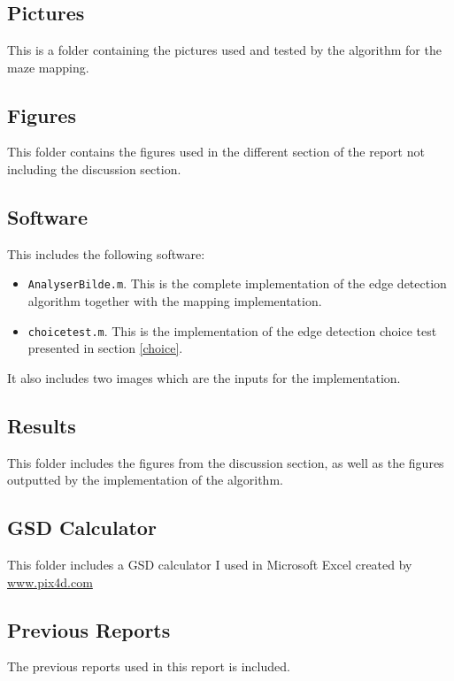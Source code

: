 \section{}
\subsection{Pictures}
This is a folder containing the pictures used and tested by the algorithm for the maze mapping. 
\subsection{Figures}
This folder contains the figures used in the different section of the report not including the discussion section.
\subsection{Software}
This includes the following software:
\begin{itemize}
\item \texttt{AnalyserBilde.m}. This is the complete implementation of the edge detection algorithm together with the mapping implementation. 
\item \texttt{choicetest.m}. This is the implementation of the edge detection choice test presented in section \ref{choice}. 
\end{itemize}
It also includes two images which are the inputs for the implementation.
\subsection{Results}
This folder includes the figures from the discussion section, as well as the figures outputted by the implementation of the algorithm.

\subsection{GSD Calculator}
This folder includes a GSD calculator I used in Microsoft Excel created by \url{www.pix4d.com}

\subsection{Previous Reports}
The previous reports used in this report is included.

